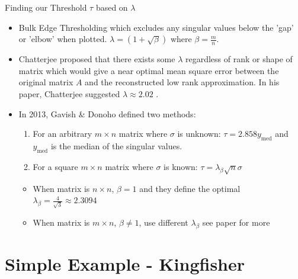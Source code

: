 \documentclass[aspectratio=169,xcolor=dvipsnames]{beamer}
\begin{document}
	
	\begin{frame}{Finding our Threshold $\tau$ based on $\lambda$}
		\begin{itemize}
			\item Bulk Edge Thresholding which excludes any singular values below the 'gap' or 'elbow' when plotted. $\lambda = (1+\sqrt{\beta})$ where $\beta = \frac{m}{n}$.
			\item Chatterjee proposed that there exists some $\lambda$ regardless of rank or shape of matrix which would give a near optimal mean square error between the original matrix $A$ and the reconstructed low rank approximation. In his paper, Chatterjee suggested $\lambda \approx 2.02$ \cite{Chatterjee2015}.  
			\item In 2013, Gavish \& Donoho defined two methods:
			\begin{enumerate}
				\item For an arbitrary $m\times n$ matrix where $\sigma$ is unknown: $\tau = 2.858y_{\text{med}}$ and $y_{\text{med}}$ is the median of the singular values.
				\item For a square $m\times n$ matrix where $\sigma$ is known: $\tau = \lambda_\beta\sqrt{n}\sigma$ 
			\end{enumerate}
			\begin{itemize}
				\item When matrix is $n\times n$, $\beta = 1$ and they define the optimal $\lambda_\beta = \frac{4}{\sqrt{3}}\approx 2.3094$
				\item When matrix is $m\times n$, $\beta \neq 1$, use different $\lambda_\beta$ see paper for more\cite{Gavish2013}
			\end{itemize}
		\end{itemize}
	\end{frame}
	
	\section{Simple Example - Kingfisher}
	
\end{document}
